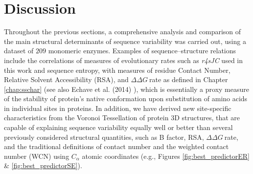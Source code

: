 \documentclass[11pt]{article}
\newcommand{\ddg}{$\Delta\Delta G~$}
\begin{document}
\section{Discussion}
\label{sec:discussion}

    Throughout the previous sections,  a comprehensive analysis and comparison of the main structural determinants of sequence variability was carried out, using a dataset of $209$ monomeric enzymes. Examples of sequence--structure relations include the correlations of measures of evolutionary rates such as {\it r4sJC} used in this work and sequence entropy, with measures of residue Contact Number, Relative Solvent Accessibility (RSA), and \ddg rate as defined in Chapter \ref{chap:sschar} (see also Echave et al. (2014) \cite{echave_relationship_2014}), which is essentially a proxy measure of the stability of protein's native conformation upon substitution of amino acids in individual sites in proteins. In addition, we have derived new site-specific characteristics from the Voronoi Tessellation of protein 3D structures, that are capable of explaining sequence variability equally well or better than several previously considered structural quantities, such as B factor, RSA, \ddg rate, and the traditional definitions of contact number and the weighted contact number (WCN) using $C_\alpha$ atomic coordinates (e.g., Figures \ref{fig:best_predictorER} \& \ref{fig:best_predictorSE}).
\end{document}
